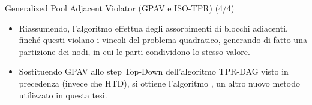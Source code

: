 \documentclass[9pt]{beamer}
\begin{document}
\begin{tframe}{Generalized Pool Adjacent Violator (GPAV e ISO-TPR) (4/4)}
\begin{center}
\end{center}
\begin{itemize}
\item Riassumendo, l’algoritmo effettua degli assorbimenti di blocchi adiacenti, finché questi violano i vincoli del problema quadratico, generando di fatto una partizione dei nodi, in cui le parti condividono lo stesso valore.
\item Sostituendo GPAV allo step Top-Down dell'algoritmo TPR-DAG visto in precedenza (invece che HTD), si ottiene l'algoritmo , un altro nuovo metodo utilizzato in questa tesi.
\end{itemize}
\end{tframe}
\end{document}

